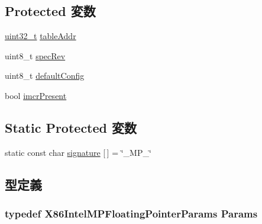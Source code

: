 \subsection*{Protected 変数}
\begin{DoxyCompactItemize}
\item 
\hyperlink{Type_8hh_a435d1572bf3f880d55459d9805097f62}{uint32\_\-t} \hyperlink{classX86ISA_1_1IntelMP_1_1FloatingPointer_a16ed5ed4b0f43ba258ed54dc46bf9c49}{tableAddr}
\item 
uint8\_\-t \hyperlink{classX86ISA_1_1IntelMP_1_1FloatingPointer_a56f76c52b1f369ed1502d8ed9d6e4027}{specRev}
\item 
uint8\_\-t \hyperlink{classX86ISA_1_1IntelMP_1_1FloatingPointer_a8eeac727c0a277a4d91446b6360f5e51}{defaultConfig}
\item 
bool \hyperlink{classX86ISA_1_1IntelMP_1_1FloatingPointer_a055d90bc092e2d3cfe4ddcd2bbcd3815}{imcrPresent}
\end{DoxyCompactItemize}
\subsection*{Static Protected 変数}
\begin{DoxyCompactItemize}
\item 
static const char \hyperlink{classX86ISA_1_1IntelMP_1_1FloatingPointer_a0a2d9cdd770f9baaf77aee1519540efa}{signature} \mbox{[}$\,$\mbox{]} = \char`\"{}\_\-MP\_\-\char`\"{}
\end{DoxyCompactItemize}


\subsection{型定義}
\hypertarget{classX86ISA_1_1IntelMP_1_1FloatingPointer_a9b05acb2e1b9f8b2b6d52a542fe703ef}{
\subsubsection[{Params}]{\setlength{\rightskip}{0pt plus 5cm}typedef X86IntelMPFloatingPointerParams {\bf Params}}}
\label{classX86ISA_1_1IntelMP_1_1FloatingPointer_a9b05acb2e1b9f8b2b6d52a542fe703ef}


